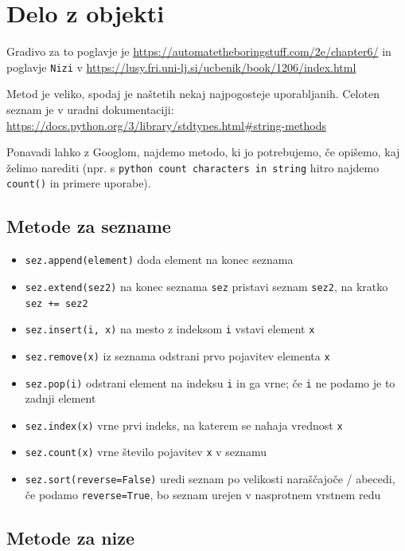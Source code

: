 \documentclass[
]{book}
\providecommand{\tightlist}{%
  \setlength{\itemsep}{0pt}\setlength{\parskip}{0pt}}
\begin{document}
\hypertarget{delo-z-objekti}{%
\chapter{Delo z objekti}\label{delo-z-objekti}}

Gradivo za to poglavje je \url{https://automatetheboringstuff.com/2e/chapter6/}
in poglavje \texttt{Nizi} v \url{https://lusy.fri.uni-lj.si/ucbenik/book/1206/index.html}

Metod je veliko, spodaj je naštetih nekaj najpogosteje uporabljanih. Celoten
seznam je v uradni dokumentaciji: \url{https://docs.python.org/3/library/stdtypes.html\#string-methods}

Ponavadi lahko z Googlom, najdemo metodo, ki jo potrebujemo, če opišemo, kaj želimo
narediti (npr. s \texttt{python\ count\ characters\ in\ string} hitro najdemo \texttt{count()} in primere uporabe).

\hypertarget{metode-za-sezname}{%
\section{Metode za sezname}\label{metode-za-sezname}}

\begin{itemize}
\tightlist
\item
  \texttt{sez.append(element)} doda element na konec seznama
\item
  \texttt{sez.extend(sez2)} na konec seznama \texttt{sez} pristavi seznam \texttt{sez2}, na kratko \texttt{sez\ +=\ sez2}
\item
  \texttt{sez.insert(i,\ x)} na mesto z indeksom \texttt{i} vstavi element \texttt{x}
\item
  \texttt{sez.remove(x)} iz seznama odstrani prvo pojavitev elementa \texttt{x}
\item
  \texttt{sez.pop(i)} odstrani element na indeksu \texttt{i} in ga vrne; če \texttt{i} ne podamo je to zadnji element
\item
  \texttt{sez.index(x)} vrne prvi indeks, na katerem se nahaja vrednost \texttt{x}
\item
  \texttt{sez.count(x)} vrne število pojavitev \texttt{x} v seznamu
\item
  \texttt{sez.sort(reverse=False)} uredi seznam po velikosti naraščajoče / abecedi, če podamo \texttt{reverse=True}, bo seznam urejen v nasprotnem vrstnem redu
\end{itemize}

\hypertarget{metode-za-nize}{%
\section{Metode za nize}\label{metode-za-nize}}
\end{document}
